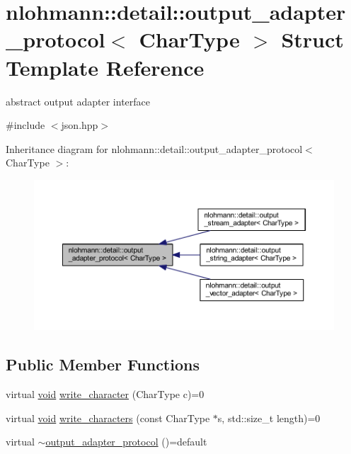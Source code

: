 \hypertarget{structnlohmann_1_1detail_1_1output__adapter__protocol}{}\section{nlohmann\+::detail\+::output\+\_\+adapter\+\_\+protocol$<$ Char\+Type $>$ Struct Template Reference}
\label{structnlohmann_1_1detail_1_1output__adapter__protocol}


abstract output adapter interface  




{\ttfamily \#include $<$json.\+hpp$>$}



Inheritance diagram for nlohmann\+::detail\+::output\+\_\+adapter\+\_\+protocol$<$ Char\+Type $>$\+:
\nopagebreak
\begin{figure}[H]
\begin{center}
\leavevmode
\includegraphics[width=350pt]{structnlohmann_1_1detail_1_1output__adapter__protocol__inherit__graph}
\end{center}
\end{figure}
\subsection*{Public Member Functions}
\begin{DoxyCompactItemize}
\item 
virtual \mbox{\hyperlink{namespacenlohmann_1_1detail_a59fca69799f6b9e366710cb9043aa77d}{void}} \mbox{\hyperlink{structnlohmann_1_1detail_1_1output__adapter__protocol_a3381896fe1be557f591de2e917cdc7d5}{write\+\_\+character}} (Char\+Type c)=0
\item 
virtual \mbox{\hyperlink{namespacenlohmann_1_1detail_a59fca69799f6b9e366710cb9043aa77d}{void}} \mbox{\hyperlink{structnlohmann_1_1detail_1_1output__adapter__protocol_a2f410a164e0eda17cf6561114b0eee4a}{write\+\_\+characters}} (const Char\+Type $\ast$s, std\+::size\+\_\+t length)=0
\item 
virtual \mbox{\hyperlink{structnlohmann_1_1detail_1_1output__adapter__protocol_ad71cdc057030f8a775a191face25061a}{$\sim$output\+\_\+adapter\+\_\+protocol}} ()=default
\end{DoxyCompactItemize}


